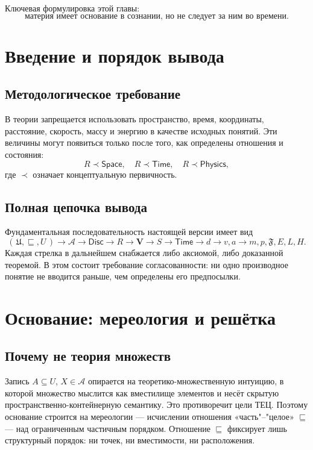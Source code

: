 \documentclass[12pt,a4paper,oneside]{book}
\theoremstyle{definition}
\theoremstyle{plain}
\theoremstyle{remark}
\newcommand{\Whole}{U}
\newcommand{\Parts}{\mathcal A}
\newcommand{\Rel}{R}
\newcommand{\Vstruct}{\mathbf V}
\newcommand{\State}{S}
\newcommand{\PartOf}{\sqsubseteq}
\newcommand{\Disc}{\mathsf{Disc}}
\newcommand{\Space}{\mathsf{Space}}
\newcommand{\Time}{\mathsf{Time}}
\newcommand{\Physics}{\mathsf{Physics}}
\begin{document}
Ключевая формулировка этой главы:
\[
\boxed{\text{материя имеет основание в сознании, но не следует за ним во времени.}}
\]

\chapter{Введение и порядок вывода}

\section{Методологическое требование}

В теории запрещается использовать пространство, время, координаты, расстояние,
скорость, массу и энергию в качестве исходных понятий. Эти величины могут появиться
только после того, как определены отношения и состояния:
\[
\Rel\prec\Space,\quad \Rel\prec\Time,\quad \Rel\prec\Physics,
\]
где $\prec$ означает концептуальную первичность.

\section{Полная цепочка вывода}

Фундаментальная последовательность настоящей версии имеет вид
\[
(\,\mathfrak U,\PartOf,\Whole\,)
\to \Parts
\to \Disc
\to \Rel
\to \Vstruct
\to \State
\to \Time
\to d
\to v,a
\to m,p,\mathfrak F,E,L,H.
\]
Каждая стрелка в дальнейшем снабжается либо аксиомой, либо доказанной теоремой. В
этом состоит требование согласованности: ни одно производное понятие не вводится
раньше, чем определены его предпосылки.

\chapter{Основание: мереология и решётка}

\section{Почему не теория множеств}

Запись $A\subseteq\Whole$, $X\in\Parts$ опирается на теоретико-множественную
интуицию, в которой множество мыслится как вместилище элементов и несёт скрытую
пространственно-контейнерную семантику. Это противоречит цели ТЕЦ. Поэтому основание
строится на мереологии --- исчислении отношения «часть"--"целое» $\PartOf$ --- над
ограниченным частичным порядком. Отношение $\PartOf$ фиксирует лишь структурный
порядок: ни точек, ни вместимости, ни расположения.
\end{document}
